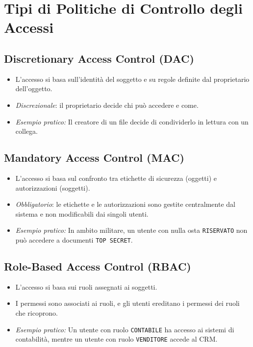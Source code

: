 \documentclass{article}
\begin{document}
\section{Tipi di Politiche di Controllo degli Accessi}

\subsection{Discretionary Access Control (DAC)}
\begin{itemize}
    \item L'accesso si basa sull'identità del soggetto e su regole definite dal proprietario dell'oggetto.
    \item \textit{Discrezionale}: il proprietario decide chi può accedere e come.
    \item \textit{Esempio pratico:} Il creatore di un file decide di condividerlo in lettura con un collega.
\end{itemize}

\subsection{Mandatory Access Control (MAC)}
\begin{itemize}
    \item L'accesso si basa sul confronto tra etichette di sicurezza (oggetti) e autorizzazioni (soggetti).
    \item \textit{Obbligatorio}: le etichette e le autorizzazioni sono gestite centralmente dal sistema e non modificabili dai singoli utenti.
    \item \textit{Esempio pratico:} In ambito militare, un utente con nulla osta \texttt{RISERVATO} non può accedere a documenti \texttt{TOP SECRET}.
\end{itemize}

\subsection{Role-Based Access Control (RBAC)}
\begin{itemize}
    \item L'accesso si basa sui ruoli assegnati ai soggetti.
    \item I permessi sono associati ai ruoli, e gli utenti ereditano i permessi dei ruoli che ricoprono.
    \item \textit{Esempio pratico:} Un utente con ruolo \texttt{CONTABILE} ha accesso ai sistemi di contabilità, mentre un utente con ruolo \texttt{VENDITORE} accede al CRM.
\end{itemize}
\end{document}
